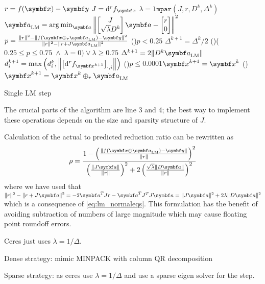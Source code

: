\begin{algorithm}
  \DontPrintSemicolon

  $r = f(\x) - \y$\;
  $J = \mathrm{d}^r f_\x$\;
  $\lambda = \mathtt{lmpar}(J, r, D^k, \Delta^{k})$ 
  $\a_\mathrm{LM} = \argmin_{\a} \left\| \begin{bmatrix} J \\ \sqrt{\lambda} D^k \end{bmatrix} \a - \begin{bmatrix} r \\ 0 \end{bmatrix} \right\|^2$ 
  $p = \frac{ \| r \|^2 - \| f(\x \oplus_r \a_\mathrm{LM}) - \y \|^2 }{\| r \|^2 - \| r + J \a_\mathrm{LM} \|^2}$ 
  \lIf(){$p < 0.25$}{ $\Delta^{k+1} = \Delta^k / 2$}
  \ElseIf(){($0.25 \leq p \leq 0.75 \; \land \; \lambda = 0) \lor \lambda \geq 0.75$}{
    $\Delta^{k+1} = 2 \| D^k \a_\mathrm{LM} \|$ 
  }
  $d_i^{k+1} = \max \left(d_i^k, \left\| \left[ \mathrm{d}^r f_{\x^{k+1}} \right]_{\cdot, i} \right\| \right)$ 
  \lIf(){$p \leq 0.0001$}{$\x^{k+1} = \x^k$}
  \lElse(){ $\x^{k+1} = \x^k \oplus_r \a_\mathrm{LM}$}

  \caption{Single LM step}
  \label{algo:lm}
\end{algorithm}

The crucial parts of the algorithm are line 3 and 4; the best way to implement these operations depends on the size and sparsity structure of $J$.

Calculation of the actual to predicted reduction ratio can be rewritten as
\begin{equation}
  \rho = \frac{1 - \left( \frac{ \| f(\x \oplus \a_\mathrm{LM}) - \y \|}{\|r\|} \right)^2 }{\left( \frac{\| J \a \|}{\| r \|} \right)^2 + 2 \left( \frac{\sqrt{\lambda} \| D \a \|}{\| r \|} \right)^2}
\end{equation}
where we have used that $\| r \|^2 - \| r + J \a \|^2 = -2 \a^T J r - \a^T J^T J \a = \| J \a \|^2 + 2 \lambda \| D \a \|^2$ which is a consequence of \eqref{eq:lm_normaleqs}. This formulation has the benefit of avoiding subtraction of numbers of large magnitude which may cause floating point roundoff errors.

\begin{remark}
  Ceres just uses $\lambda = 1 / \Delta$.

  Dense strategy: mimic MINPACK with column QR decomposition

  Sparse strategy: as ceres use $\lambda = 1 / \Delta$ and use a sparse eigen solver for the step.
\end{remark}

